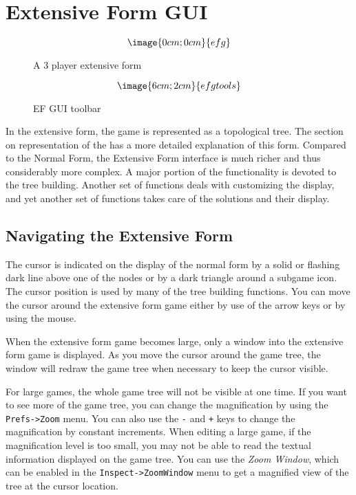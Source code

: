 {%
\section{Extensive Form GUI}

\begin{figure}
$$\image{0cm;0cm}{efg}$$
\caption{A 3 player extensive form}\label{fig_efg}
\end{figure}

\begin{figure}
$$\image{6cm;2cm}{efgtools}$$
\caption{EF GUI toolbar}\label{fig_efgtools}
\end{figure}

In the extensive form, the game is represented as a topological tree.  The 
section on representation of the  
has a more detailed explanation of this form.
Compared to the Normal Form, the Extensive Form interface is much richer
and thus considerably more complex.  A major portion of the functionality
is devoted to the tree building.  Another set of functions deals with
customizing the display, and yet another set of functions takes care of
the solutions and their display.  

\subsection{Navigating the Extensive Form}
The cursor is indicated on the display of the normal form by a 
solid or flashing dark line above 
one of the nodes or by a dark triangle around a subgame icon. 
The cursor position is used by many of the tree building functions.  
You can move the cursor around the extensive form game 
either by use of the arrow keys or by using the mouse.  

When the extensive form 
game becomes large, only a window into the extensive form game is displayed.  
As you move the cursor around the game tree, the window will redraw 
the game tree when necessary to keep the cursor visible. 

For large games, the whole game tree will not be visible at one time.  If you 
want to see more of the game tree, you can change the magnification by 
using the {\tt Prefs->Zoom} menu.  You can also use the \verb+-+ and 
\verb&+& keys to change the magnification by constant increments. When 
editing a large game, if the magnification level is too small, you may 
not be able to read the textual information displayed on the game tree.  You 
can use the {\em Zoom Window}, which can be enabled in the 
{\tt Inspect->ZoomWindow} menu to get a magnified view of the tree 
at the cursor location.  

}
